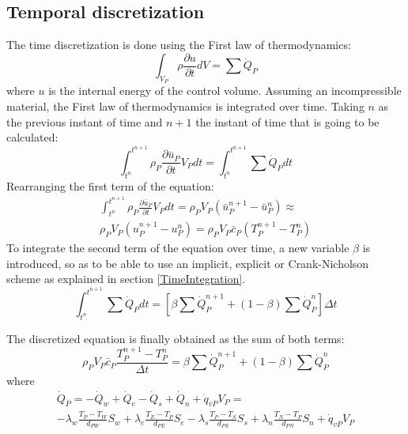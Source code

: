\subsection{Temporal discretization}
\label{TemporalDiscretizationConduction}
The time discretization is done using the First law of thermodynamics:
\begin{equation}
\int_{V_{P}}^{}\rho\frac{\partial u}{\partial t}dV=\sum\dot{Q}_{P}
\end{equation}
where $u$ is the internal energy of the control volume.
Assuming an incompressible material, the First law of thermodynamics is integrated over time. Taking $n$ as the previous instant of time and $n+1$ the instant of time that is going to be calculated:
\begin{equation}
\int_{t^{n}}^{t^{n+1}}\rho_{P}\frac{\partial\bar{u}_{P}}{\partial t}V_{P}dt=\int_{t^{n}}^{t^{n+1}}\sum\dot{Q}_{P}dt
\end{equation}
Rearranging the first term of the equation:
\begin{multline}
\int_{t^{n}}^{t^{n+1}}\rho_{P}\frac{\partial\bar{u}_{P}}{\partial t}V_{P}dt=\rho_{P}V_{P}\left(\bar{u}_{P}^{n+1}-\bar{u}_{P}^{n}\right)\approx \\
\rho_{P}V_{P}\left(u_{P}^{n+1}-u_{P}^{n}\right)=\rho_{P}V_{P}\bar{c}_{P}\left(T_{P}^{n+1}-T_{P}^{n}\right)
\end{multline}
To integrate the second term of the equation over time, a new variable $\beta$ is introduced, so as to be able to use an implicit, explicit or Crank-Nicholson scheme as explained in section \ref{TimeIntegration}.
\begin{equation}
\int_{t^{n}}^{t^{n+1}}\sum\dot{Q}_{P}dt=\left[\beta\sum\dot{Q}_{P}^{n+1}+\left(1-\beta\right)\sum\dot{Q}_{P}^{n}\right]\Delta t
\end{equation}

The discretized equation is finally obtained as the sum of both terms:
\begin{equation}
\rho_{P}V_{P}\bar{c}_{P}\frac{T_{P}^{n+1}-T_{P}^{n}}{\Delta t}=\beta\sum\dot{Q}_{P}^{n+1}+\left(1-\beta\right)\sum\dot{Q}_{P}^{n}
\end{equation}
where
\begin{multline}
	\dot{Q}_{P}=-\dot{Q}_{w}+\dot{Q}_{e}-\dot{Q}_{s}+\dot{Q}_{n}+\dot{q}_{vP}V_{P}= \\
	-\lambda_{w}\frac{T_{P}-T_{W}}{d_{PW}}S_{w}+\lambda_{e}\frac{T_{E}-T_{P}}{d_{PE}}S_{e}-\lambda_{s}\frac{T_{P}-T_{S}}{d_{PS}}S_{s}+\lambda_{n}\frac{T_{N}-T_{P}}{d_{PN}}S_{n}+\dot{q}_{vP}V_{P}
\end{multline}

